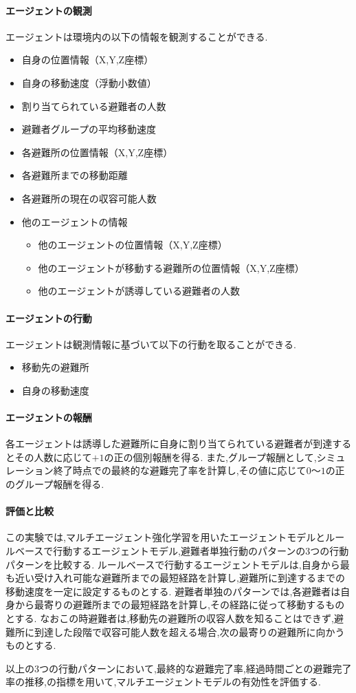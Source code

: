 \paragraph{エージェントの観測}
エージェントは環境内の以下の情報を観測することができる.
\begin{itemize}
  \item 自身の位置情報（X,Y,Z座標）
  \item 自身の移動速度（浮動小数値）
  \item 割り当てられている避難者の人数
  \item 避難者グループの平均移動速度
  \item 各避難所の位置情報（X,Y,Z座標）
  \item 各避難所までの移動距離
  \item 各避難所の現在の収容可能人数
  \item 他のエージェントの情報
  \begin{itemize}
    \item 他のエージェントの位置情報（X,Y,Z座標）
    \item 他のエージェントが移動する避難所の位置情報（X,Y,Z座標）
    \item 他のエージェントが誘導している避難者の人数
  \end{itemize}
\end{itemize}
  
 
\paragraph{エージェントの行動}
エージェントは観測情報に基づいて以下の行動を取ることができる.
\begin{itemize}
  \item 移動先の避難所
  \item 自身の移動速度
\end{itemize}

\paragraph{エージェントの報酬}
各エージェントは誘導した避難所に自身に割り当てられている避難者が到達するとその人数に応じて$+1$の正の個別報酬を得る.
また,グループ報酬として,シミュレーション終了時点での最終的な避難完了率を計算し,その値に応じて$0$～$1$の正のグループ報酬を得る.

\paragraph{評価と比較}
この実験では,マルチエージェント強化学習を用いたエージェントモデルとルールベースで行動するエージェントモデル,避難者単独行動のパターンの3つの行動パターンを比較する.
ルールベースで行動するエージェントモデルは,自身から最も近い受け入れ可能な避難所までの最短経路を計算し,避難所に到達するまでの移動速度を一定に設定するものとする.
避難者単独のパターンでは,各避難者は自身から最寄りの避難所までの最短経路を計算し,その経路に従って移動するものとする.
なおこの時避難者は,移動先の避難所の収容人数を知ることはできず,避難所に到達した段階で収容可能人数を超える場合,次の最寄りの避難所に向かうものとする.\par

以上の3つの行動パターンにおいて,最終的な避難完了率,経過時間ごとの避難完了率の推移,の指標を用いて,マルチエージェントモデルの有効性を評価する.
